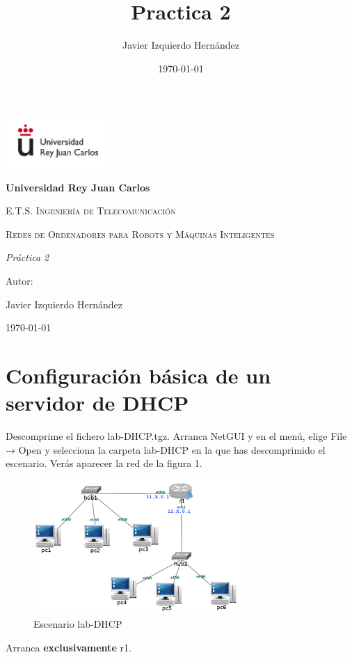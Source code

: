 \documentclass[12pt, a4paper]{report}
\title{Practica 2}
\author{Javier Izquierdo Hernández}
\date{\today}
\begin{document}
	\begin{titlepage}
		\centering
		{\includegraphics[width=0.3\textwidth]{logo}\par}
		\vspace{1cm}
		{\bfseries\LARGE Universidad Rey Juan Carlos \par}
		\vspace{1cm}
		{\scshape\Large E.T.S. Ingeniería de Telecomunicación \par}
		\vspace{3cm}
		{\scshape\Huge Redes de Ordenadores para Robots y Máquinas Inteligentes \par}
		\vspace{3cm}
		{\itshape\Large Práctica 2 \par}
		\vfill
		{\Large Autor: \par}
		{\Large Javier Izquierdo Hernández \par}
		\vfill
		{\Large \today \par}
	\end{titlepage}

\newpage
\renewcommand{\contentsname}{Contenidos}
\tableofcontents
\newpage

\chapter{Configuración básica de un servidor de DHCP}
Descomprime el fichero lab-DHCP.tgz. Arranca NetGUI y en el menú, elige File → Open y selecciona la
carpeta lab-DHCP en la que has descomprimido el escenario. Verás aparecer la red de la figura 1.\\

\begin{figure}[h]
	\centering
	\includegraphics[width=0.7\textwidth]{enunciado_1}
	\caption{Escenario lab-DHCP}
\end{figure}
Arranca \textbf{exclusivamente} r1.\\
\end{document}
